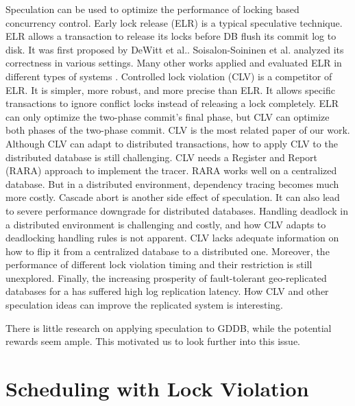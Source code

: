 \documentclass[conference]{IEEEtran}
\begin{document}
Speculation can be used to optimize the performance of locking based concurrency control.
Early lock release (ELR)
\cite{EfficientLocking:conf/vldb/KimuraGK12}
\cite{ELR:dewitt_implementation_1984}
\cite{PS2PL:conf/icdt/Soisalon-SoininenY95}
\cite{Aether:journals/pvldb/JohnsonPSAA10}
\cite{Actor-Oriented-DB:conf/icde/Bernstein18}
is a typical speculative technique.
ELR allows a transaction to release its locks before DB flush its commit log to disk.
It was first proposed by DeWitt et al.\cite{ELR:dewitt_implementation_1984}.
Soisalon-Soininen et al. \cite{PS2PL:conf/icdt/Soisalon-SoininenY95} analyzed its correctness in various settings.
Many other works applied and evaluated ELR in different types of systems
\cite{EfficientLocking:conf/vldb/KimuraGK12}
\cite{Aether:journals/pvldb/JohnsonPSAA10}.
 \cite{CLV:conf/sigmod/GraefeLKTV13} 
 Controlled lock violation (CLV) \cite{CLV:conf/sigmod/GraefeLKTV13}  is a competitor of ELR. 
 It is simpler, more robust, and more precise than ELR.
 It allows specific transactions to ignore conflict locks instead of releasing a lock completely.
 ELR can only optimize the two-phase commit's final phase, but CLV can optimize both phases of the two-phase commit.
 CLV is the most related paper of our work.
 Although CLV can adapt to distributed transactions, 
 how to apply CLV to the distributed database is still challenging.
 CLV needs a Register and Report (RARA) approach \cite{HeckatonMVCC:journals/pvldb/LarsonBDFPZ11} to implement the tracer.
 RARA works well on a centralized database. 
 But in a distributed environment, dependency tracing becomes much more costly.
 Cascade abort is another side effect of speculation. 
 It can also lead to severe performance downgrade for distributed databases.
 Handling deadlock in a distributed environment is challenging and costly, and how CLV adapts to deadlocking handling rules is not apparent.
 CLV lacks adequate information on how to flip it from a centralized database to a distributed one. 
 Moreover, the performance of different lock violation timing and their restriction is still unexplored.
 Finally,   the increasing prosperity of fault-tolerant geo-replicated databases for a  has suffered high log replication latency.
 How CLV and other speculation ideas can improve the replicated system is interesting.

There is little research on applying speculation to GDDB, while the potential rewards seem ample. This motivated us to look further into this issue.


\section{Scheduling with Lock Violation}
\label{sec:non_strict}
\end{document}
